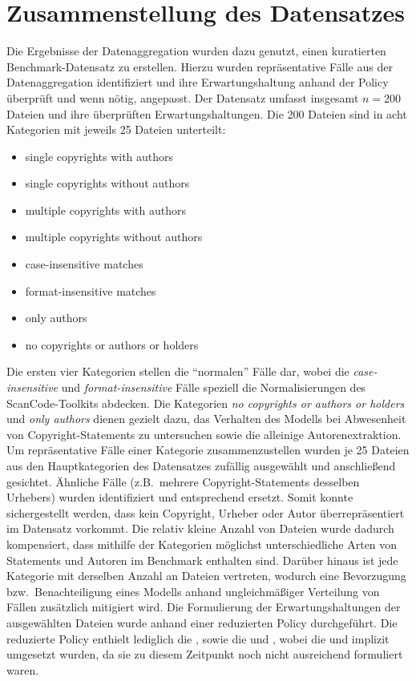 
\section{Zusammenstellung des Datensatzes}\label{sec:datensatz-benchmark}

Die Ergebnisse der Datenaggregation wurden dazu genutzt, einen kuratierten Benchmark-Datensatz zu erstellen.
Hierzu wurden repräsentative Fälle aus der Datenaggregation identifiziert und ihre Erwartungshaltung anhand der Policy überprüft und wenn nötig, angepasst.
Der Datensatz umfasst insgesamt $n=200$ Dateien und ihre überprüften Erwartungshaltungen.
Die \num{200} Dateien sind in acht Kategorien mit jeweils \num{25} Dateien unterteilt:

\begin{itemize}
    \item single copyrights with authors
    \item single copyrights without authors
    \item multiple copyrights with authors
    \item multiple copyrights without authors
    \item case-insensitive matches
    \item format-insensitive matches
    \item only authors
    \item no copyrights or authors or holders
\end{itemize}

Die ersten vier Kategorien stellen die \enquote{normalen} Fälle dar, wobei die \textit{case-insensitive} und \textit{format-insensitive} Fälle speziell die Normalisierungen des ScanCode-Toolkits abdecken.
Die Kategorien \textit{no copyrights or authors or holders} und \textit{only authors} dienen gezielt dazu, das Verhalten des Modells bei Abwesenheit von Copyright-Statements zu untersuchen sowie die alleinige Autorenextraktion.
Um repräsentative Fälle einer Kategorie zusammenzustellen wurden je \num{25} Dateien aus den Hauptkategorien des Datensatzes zufällig ausgewählt und anschließend gesichtet.
Ähnliche Fälle (z.B.\ mehrere Copyright-Statements desselben Urhebers) wurden identifiziert und entsprechend ersetzt.
Somit konnte sichergestellt werden, dass kein Copyright, Urheber oder Autor überrepräsentiert im Datensatz vorkommt.
Die relativ kleine Anzahl von Dateien wurde dadurch kompensiert, dass mithilfe der Kategorien möglichst unterschiedliche Arten von Statements und Autoren im Benchmark enthalten sind.
Darüber hinaus ist jede Kategorie mit derselben Anzahl an Dateien vertreten, wodurch eine Bevorzugung bzw.\ Benachteiligung eines Modells anhand ungleichmäßiger Verteilung von Fällen zusätzlich mitigiert wird.
Die Formulierung der Erwartungshaltungen der ausgewählten Dateien wurde anhand einer reduzierten Policy durchgeführt.
Die reduzierte Policy enthielt lediglich die , sowie die  und , wobei die  und  implizit umgesetzt wurden, da sie zu diesem Zeitpunkt noch nicht ausreichend formuliert waren.

